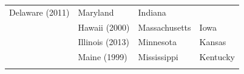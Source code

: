\documentclass[11pt,]{article}
\begin{document}
\begin{longtable}[]{@{}llll@{}}
\begin{minipage}[t]{0.26\columnwidth}
Delaware (2011)\strut
\end{minipage} & \begin{minipage}[t]{0.24\columnwidth}\raggedright
Maryland\strut
\end{minipage} & \begin{minipage}[t]{0.19\columnwidth}\raggedright
Indiana\strut
\end{minipage}\tabularnewline
\begin{minipage}[t]{0.20\columnwidth}\raggedright
\strut
\end{minipage} & \begin{minipage}[t]{0.26\columnwidth}\raggedright
Hawaii (2000)\strut
\end{minipage} & \begin{minipage}[t]{0.24\columnwidth}\raggedright
Massachusetts\strut
\end{minipage} & \begin{minipage}[t]{0.19\columnwidth}\raggedright
Iowa\strut
\end{minipage}\tabularnewline
\begin{minipage}[t]{0.20\columnwidth}\raggedright
\strut
\end{minipage} & \begin{minipage}[t]{0.26\columnwidth}\raggedright
Illinois (2013)\strut
\end{minipage} & \begin{minipage}[t]{0.24\columnwidth}\raggedright
Minnesota\strut
\end{minipage} & \begin{minipage}[t]{0.19\columnwidth}\raggedright
Kansas\strut
\end{minipage}\tabularnewline
\begin{minipage}[t]{0.20\columnwidth}\raggedright
\strut
\end{minipage} & \begin{minipage}[t]{0.26\columnwidth}\raggedright
Maine (1999)\strut
\end{minipage} & \begin{minipage}[t]{0.24\columnwidth}\raggedright
Mississippi\strut
\end{minipage} & \begin{minipage}[t]{0.19\columnwidth}\raggedright
Kentucky\strut
\end{minipage}\tabularnewline
\begin{minipage}[t]{0.20\columnwidth}\raggedright
\strut
\end{minipage} & \begin{minipage}[t]{0.26\columnwidth}\raggedright

\end{minipage}
\end{longtable}
\end{document}
